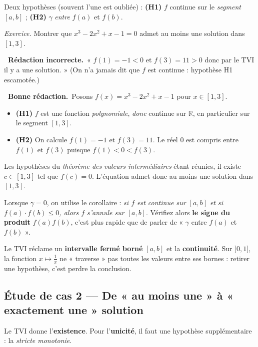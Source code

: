 \documentclass[11pt,a4paper]{article}
\newcommand{\ok}{\textcolor{METeal}{\textbf{\ding{51}\ \sffamily Bonne rédaction.}}\ }
\newcommand{\ko}{\textcolor{MECoral}{\textbf{\ding{55}\ \sffamily Rédaction incorrecte.}}\ }
\newcommand{\R}{\mathbb{R}}
\begin{document}
Deux hypothèses (souvent l'une est oubliée) : \textbf{(H1)} $f$ continue sur le
\emph{segment} $[a,b]$ ; \textbf{(H2)} $\gamma$ \emph{entre} $f(a)$ et $f(b)$.

\emph{Exercice.} Montrer que $x^3-2x^2+x-1=0$ admet au moins une solution dans $[1,3]$.
\begin{mauvaise}
\ko « $f(1)=-1<0$ et $f(3)=11>0$ donc par le TVI il y a une solution. » \quad(On n'a jamais
dit que $f$ est continue : hypothèse H1 escamotée.)
\end{mauvaise}
\begin{bonne}
\ok Posons $f(x)=x^3-2x^2+x-1$ pour $x\in[1,3]$.
\begin{itemize}
  \item \textbf{(H1)} $f$ est une fonction \emph{polynomiale}, \emph{donc} continue sur $\R$,
  en particulier sur le segment $[1,3]$.
  \item \textbf{(H2)} On calcule $f(1)=-1$ et $f(3)=11$. Le réel $0$ est compris entre $f(1)$
  et $f(3)$ puisque $f(1)<0<f(3)$.
\end{itemize}
Les hypothèses du \emph{théorème des valeurs intermédiaires} étant réunies, il existe
$c\in[1,3]$ tel que $f(c)=0$. L'équation admet donc au moins une solution dans $[1,3]$.
\end{bonne}

\begin{astuce}
Lorsque $\gamma=0$, on utilise le corollaire : \emph{si $f$ est continue sur $[a,b]$ et si
$f(a)\cdot f(b)\le 0$, alors $f$ s'annule sur $[a,b]$}. Vérifiez alors \textbf{le signe du
produit} $f(a)f(b)$, c'est plus rapide que de parler de « $\gamma$ entre $f(a)$ et $f(b)$ ».
\end{astuce}

\begin{attention}
Le TVI réclame un \textbf{intervalle fermé borné} $[a,b]$ et la \textbf{continuité}. Sur
$]0,1]$, la fonction $x\mapsto \frac1x$ ne « traverse » pas toutes les valeurs entre ses
bornes : retirer une hypothèse, c'est perdre la conclusion.
\end{attention}

\subsection{Étude de cas 2 — De « au moins une » à « exactement une » solution}

Le TVI donne l'\textbf{existence}. Pour l'\textbf{unicité}, il faut une hypothèse
supplémentaire : la \emph{stricte monotonie}.
\end{document}
